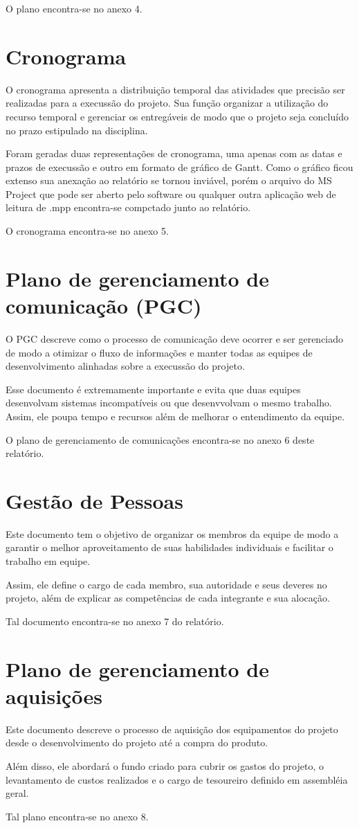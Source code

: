 O plano encontra-se no anexo 4.

\section{Cronograma}

O cronograma apresenta a distribuição temporal das atividades que precisão ser realizadas para a execussão do projeto. Sua função organizar a utilização do recurso temporal e gerenciar os entregáveis de modo que o projeto seja concluído no prazo estipulado na disciplina.

Foram geradas duas representações de cronograma, uma apenas com as datas e prazos de execussão e outro em formato de gráfico de Gantt. Como o gráfico ficou extenso sua anexação ao relatório se tornou inviável, porém o arquivo do MS Project que pode ser aberto pelo software ou qualquer outra aplicação web de leitura de .mpp encontra-se compctado junto ao relatório.

O cronograma encontra-se no anexo 5.

\section{Plano de gerenciamento de comunicação (PGC)}

O PGC descreve como o processo de comunicação deve ocorrer e ser gerenciado de modo a otimizar o fluxo de informações e manter todas as equipes de desenvolvimento alinhadas sobre a execussão do projeto.

Esse documento é extremamente importante e evita que duas equipes desenvolvam sistemas incompatíveis ou que desenvvolvam o mesmo trabalho. Assim, ele poupa tempo e recursos além de melhorar o entendimento da equipe.

O plano de gerenciamento de comunicações encontra-se no anexo 6 deste relatório.

\section{Gestão de Pessoas}

Este documento tem o objetivo de organizar os membros da equipe de modo a garantir o melhor aproveitamento de suas habilidades individuais e facilitar o trabalho em equipe.

Assim, ele define o cargo de cada membro, sua autoridade e seus deveres no projeto, além de explicar as competências de cada integrante e sua alocação.

Tal documento encontra-se no anexo 7 do relatório.

\section{Plano de gerenciamento de aquisições}

Este documento descreve o processo de aquisição dos equipamentos do projeto desde o desenvolvimento do projeto até a compra do produto.

Além disso, ele abordará o fundo criado para cubrir os gastos do projeto, o levantamento de custos realizados e o cargo de tesoureiro definido em assembléia geral.

Tal plano encontra-se no anexo 8.
